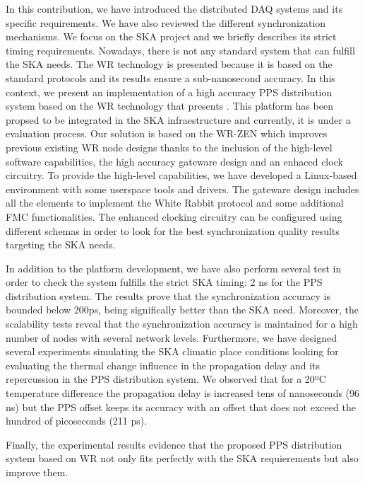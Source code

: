 In this contribution, we have introduced the distributed DAQ systems and its specific requirements. We have also reviewed the different synchronization mechanisms. We focus on the SKA project and we briefly describes its strict timing requirements. Nowadays, there is not any standard system that can fulfill the SKA needs. The WR technology is presented because it is based on the standard protocols and its results ensure a sub-nanosecond accuracy. In this context, we present an implementation of a high accuracy PPS distribution system based on the WR technology that presents . This platform has been propsed to be integrated in the SKA infraestructure and currently, it is under a evaluation process. 
Our solution is based on the WR-ZEN which improves previous existing WR node designs 
thanks to the inclusion of the high-level software capabilities, the high accuracy gateware
design and an enhaced clock circuitry.
To provide the high-level capabilities, we have developed a Linux-based environment with some
userspace tools and drivers. The gateware design includes all the elements to implement the 
White Rabbit protocol and some additional FMC functionalities. The enhanced clocking circuitry can be configured using different schemas in order to look for the best synchronization quality results targeting the SKA needs. 

In addition to the platform development, we have also perform several test in order to check the system fulfills the strict SKA timing: 2 ns for the PPS distribution system. The results prove that the synchronization accuracy is bounded below 200ps, being significally better than the SKA need. Moreover, the scalability tests reveal that the synchronization accuracy is maintained for a high number of nodes with several network levels. Furthermore, we have 
designed several experiments simulating the SKA climatic place conditions 
looking for evaluating the thermal change influence in the propagation delay 
and its repercussion in the PPS distribution system. We observed that for a 
20ºC temperature difference the propagation delay is increased tens of 
nanoseconds (96 ns) but the PPS offset keeps its accuracy with an offset that 
does not exceed the hundred of picoseconds (211 ps). 

Finally, the experimental results evidence that the proposed PPS distribution system based on WR not only fits perfectly with the SKA requierements but also improve them.


